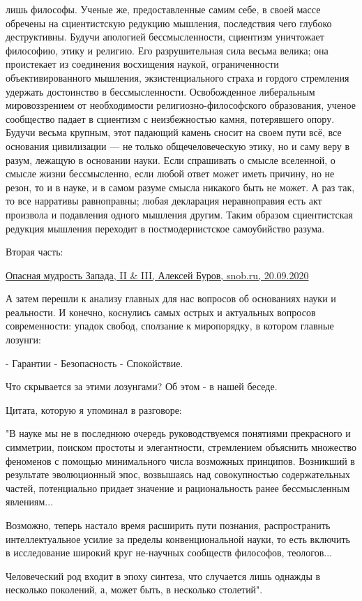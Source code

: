 \begin{multicols}{3}
лишь философы. Ученые же, предоставленные самим себе, в своей массе обречены на
сциентистскую редукцию мышления, последствия чего глубоко деструктивны. Будучи
апологией бессмысленности, сциентизм уничтожает философию, этику и религию. Его
разрушительная сила весьма велика; она проистекает из соединения восхищения
наукой, ограниченности объективированного мышления, экзистенциального страха и
гордого стремления удержать достоинство в бессмысленности. Освобожденное
либеральным мировоззрением от необходимости религиозно-философского
образования, ученое сообщество падает в сциентизм с неизбежностью камня,
потерявшего опору. Будучи весьма крупным, этот падающий камень сносит на своем
пути всё, все основания цивилизации — не только общечеловеческую этику, но и
саму веру в разум, лежащую в основании науки. Если спрашивать о смысле
вселенной, о смысле жизни бессмысленно, если любой ответ может иметь причину,
но не резон, то и в науке, и в самом разуме смысла никакого быть не может. А
раз так, то все нарративы равноправны; любая декларация неравноправия есть акт
произвола и подавления одного мышления другим. Таким образом сциентистская
редукция мышления переходит в постмодернистское самоубийство разума. 

\end{multicols}

Вторая часть: 

\href{https://snob.ru/profile/27355/blog/170283}{%
Опасная мудрость Запада, II \& III, Алексей Буров, snob.ru, 20.09.2020%
}


А затем перешли к анализу главных для нас вопросов об основаниях  науки и
реальности. И конечно, коснулись самых острых и актуальных вопросов
современности: упадок свобод, сползание к миропорядку, в котором главные
лозунги:

\obeycr
- Гарантии
- Безопасность
- Спокойствие.
\restorecr

Что скрывается за этими лозунгами? Об этом - в нашей беседе.  

Цитата, которую я упоминал в разговоре: 

\begin{zznagolos}
"В науке мы не в последнюю очередь руководствуемся понятиями прекрасного и
симметрии, поиском простоты и элегантности, стремлением объяснить множество
феноменов с помощью минимального числа возможных принципов. Возникший в
результате эволюционный эпос, возвышаясь над совокупностью содержательных
частей, потенциально придает значение и рациональность ранее бессмысленным
явлениям... 

Возможно, теперь настало время расширить пути познания, распространить
интеллектуальное усилие за пределы конвенциональной науки, то есть
включить в исследование широкий круг не-научных сообществ философов,
теологов... 

Человеческий род входит в эпоху синтеза, что случается лишь однажды в несколько
поколений, а, может быть, в несколько столетий". 
\end{zznagolos}


